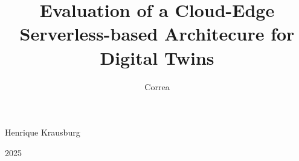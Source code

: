 \title{Evaluation of a Cloud-Edge Serverless-based Architecure for Digital Twins}
\author{Correa}{Henrique Krausburg}
\date{}{2025}
